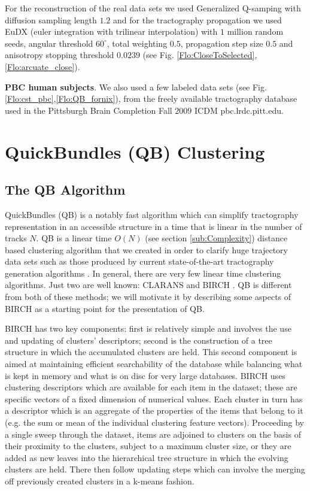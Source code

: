 \documentclass[preprint,authoryear,a4paper,10pt,onecolumn]{elsarticle}
\begin{document}
For the reconstruction of the real data sets we used Generalized
Q-samping with diffusion sampling length $1.2$ and for the tractography
propagation we used EuDX (euler integration with trilinear
interpolation) with $1$ million random seeds, angular threshold
$60^{\circ}$, total weighting $0.5$, propagation step size $0.5$ and
anisotropy stopping threshold $0.0239$ (see
Fig. \ref{Flo:CloseToSelected},\ref{Flo:arcuate_close}).

\textbf{PBC human subjects}. We also used a few labeled data sets (see
Fig.\ref{Flo:cst_pbc},\ref{Flo:QB_fornix}), from the freely available
tractography database used in the Pittsburgh Brain Completion Fall
$2009$ ICDM pbc.lrdc.pitt.edu.


\section{QuickBundles (QB) Clustering}

\subsection{The QB Algorithm}

QuickBundles (QB) is a notably fast algorithm which can simplify
tractography representation in an accessible structure in a time that is
linear in the number of tracks $N$. QB is a linear time $O(N)$ (see
section \ref{sub:Complexity}) distance based clustering algorithm that
we created in order to clarify huge trajectory data sets such as those
produced by current state-of-the-art tractography generation algorithms
\cite{Parker2003,WWS+08}. In general, there are very few linear time
clustering algorithms. Just two are well known: CLARANS
\cite{ng2002clarans} and BIRCH \cite{zhang1997birch}. QB is different
from both of these methods; we will motivate it by describing some
aspects of BIRCH as a starting point for the presentation of QB.

BIRCH has two key components: first is relatively simple and involves
the use and updating of clusters' descriptors; second is the
construction of a tree structure in which the accumulated clusters are
held. This second component is aimed at maintaining efficient
searchability of the database while balancing what is kept in memory and
what is on disc for very large databases. BIRCH uses clustering
descriptors which are available for each item in the dataset; these are
specific vectors of a fixed dimension of numerical values. Each cluster
in turn has a descriptor which is an aggregate of the properties of the
items that belong to it (e.g. the sum or mean of the individual
clustering feature vectors). Proceeding by a single sweep through the
dataset, items are adjoined to clusters on the basis of their proximity
to the clusters, subject to a maximum cluster size, or they are added as
new leaves into the hierarchical tree structure in which the evolving
clusters are held. There then follow updating steps which can involve
the merging off previously created clusters in a k-means
fashion\cite{steinhaus1956division,macqueen1967some}.
\end{document}

